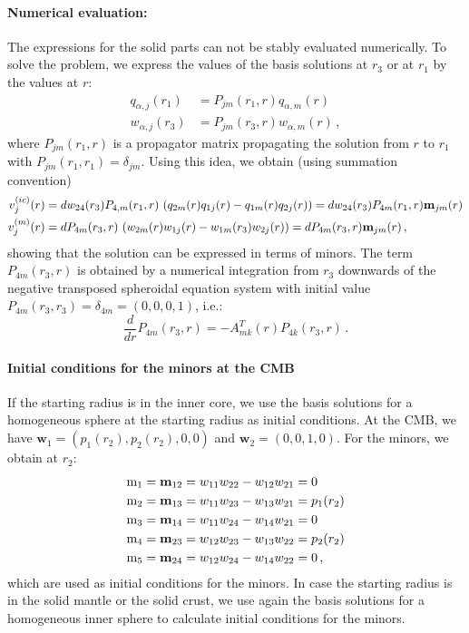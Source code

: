 \documentclass[12pt,a4paper]{article}
\begin{document}
\paragraph{Numerical evaluation:}
The expressions for the solid parts can not be stably evaluated numerically. To solve the problem, we express the values of the basis solutions at $r_3$ or at $r_1$ by the values at $r$:
\begin{align}
q_{\alpha,j}(r_1) &= P_{jm}(r_1,r) q_{\alpha,m}(r)  \nonumber \\
w_{\alpha,j}(r_3) & = P_{jm}(r_3,r) w_{\alpha,m}(r) \,,
\end{align}
where $P_{jm}(r_1,r)$ is a propagator matrix propagating the solution from $r$ to $r_1$ with $P_{jm}(r_1,r_1) = \delta_{jm}$.
%
Using this idea, we obtain (using summation convention)
\begin{align}\label{gfkmin}
v^{(ic)}_j(r) &=  dw_{24}(r_3) P_{4,m}(r_1,r)\ (q_{2m}(r)q_{1j}(r) - q_{1m}(r)q_{2j}(r)) 
= dw_{24}(r_3) P_{4m}(r_1,r) \mathbf{m}_{jm}(r) \notag \\ 
v^{(m)}_j(r) &= d P_{4m}(r_3,r)\ (w_{2m}(r)w_{1j}(r) - w_{1m}(r_3) w_{2j}(r)) 
= d P_{4m}(r_3,r) \mathbf{m}_{jm}(r)\,,
\end{align}
showing that the solution can be expressed in terms of minors. The term $P_{4m}(r_3,r)$ is obtained by a numerical integration from $r_3$ downwards of the negative transposed spheroidal equation system with initial value $P_{4m}(r_3,r_3) = \delta_{4m} = (0,0,0,1)$, i.e.:
\begin{equation}
\frac{d}{dr}P_{4m}(r_3,r) = -A^T_{mk}(r)P_{4k}(r_3,r) \,.
\end{equation}
%
\paragraph{Initial conditions for the minors at the CMB}
If the starting radius is in the inner core, we use the basis solutions for a homogeneous sphere at the starting radius as initial conditions. At the CMB, we have $\mathbf{w}_1 = (p_1(r_2),p_2(r_2),0,0)$ and $\mathbf{w}_2=(0,0,1,0)$. For the minors, we obtain at $r_2$:
\begin{align}
\mathrm{m}_1 &= \mathbf{m}_{12} = w_{11}w_{22}-w_{12}w_{21} = 0              \notag \\
\mathrm{m}_2 &= \mathbf{m}_{13} = w_{11}w_{23}-w_{13}w_{21} = p_1(r_2)   \notag \\
\mathrm{m}_3 &= \mathbf{m}_{14} = w_{11}w_{24}-w_{14}w_{21} = 0              \notag \\
\mathrm{m}_4 &= \mathbf{m}_{23} = w_{12}w_{23}-w_{13}w_{22} = p_2(r_2)   \notag \\
\mathrm{m}_5 &= \mathbf{m}_{24} = w_{12}w_{24}-w_{14}w_{22} = 0              \,,
\end{align}
which are used as initial conditions for the minors. In case the starting radius is in the solid mantle or the solid crust, we use again the basis solutions for a homogeneous inner sphere to calculate initial conditions for the minors.
%
\end{document}
